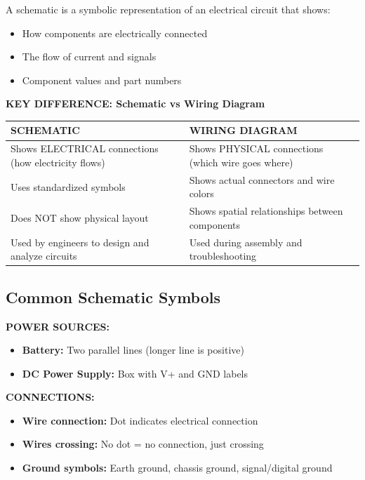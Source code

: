 \documentclass[11pt,letterpaper]{article}
\begin{document}
A schematic is a symbolic representation of an electrical circuit that shows:
\begin{itemize}
\item How components are electrically connected
\item The flow of current and signals
\item Component values and part numbers
\end{itemize}

\textbf{KEY DIFFERENCE: Schematic vs Wiring Diagram}

\begin{tabular}{|p{}|p{}|}
\hline
\textbf{SCHEMATIC} & \textbf{WIRING DIAGRAM} \\
\hline
Shows ELECTRICAL connections (how electricity flows) & Shows PHYSICAL connections (which wire goes where) \\
\hline
Uses standardized symbols & Shows actual connectors and wire colors \\
\hline
Does NOT show physical layout & Shows spatial relationships between components \\
\hline
Used by engineers to design and analyze circuits & Used during assembly and troubleshooting \\
\hline
\end{tabular}

\subsection{Common Schematic Symbols}

\textbf{POWER SOURCES:}

\begin{itemize}
\item \textbf{Battery:} Two parallel lines (longer line is positive)
\item \textbf{DC Power Supply:} Box with V+ and GND labels
\end{itemize}

\textbf{CONNECTIONS:}

\begin{itemize}
\item \textbf{Wire connection:} Dot indicates electrical connection
\item \textbf{Wires crossing:} No dot = no connection, just crossing
\item \textbf{Ground symbols:} Earth ground, chassis ground, signal/digital ground
\end{itemize}
\end{document}
